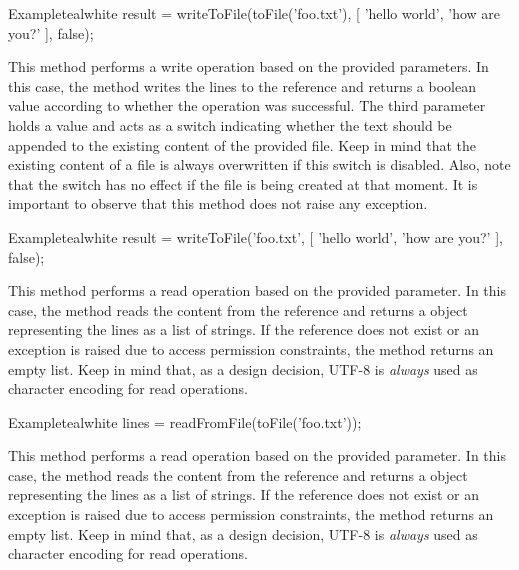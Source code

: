 \begin{description}
\begin{codebox}{Example}{teal}{\icnote}{white}
result = writeToFile(toFile('foo.txt'),
         [ 'hello world', 'how are you?' ], false);
\end{codebox}

\item[\mdbox{R}{\parbox{0.51\textwidth}{writeToFile(String reference,\\\hspace*{1em} List<String> lines, boolean append)}}{boolean}] This method performs a write operation based on the provided parameters. In this case, the method writes the  lines to the  reference and returns a boolean value according to whether the operation was successful. The third parameter holds a  value and acts as a switch indicating whether the text should be appended to the existing content of the provided file. Keep in mind that the existing content of a file is always overwritten if this switch is disabled. Also, note that the switch has no effect if the file is being created at that moment. It is important to observe that this method does not raise any exception.

\begin{codebox}{Example}{teal}{\icnote}{white}
result = writeToFile('foo.txt', [ 'hello world',
         'how are you?' ], false);
\end{codebox}

\item[\mdbox{R}{readFromFile(File file)}{List<String>}] This method performs a read operation based on the provided parameter. In this case, the method reads the content from the  reference and returns a  object representing the lines as a list of strings. If the reference does not exist or an exception is raised due to access permission constraints, the  method returns an empty list. Keep in mind that, as a design decision, UTF-8 is \emph{always} used as character encoding for read operations.

\begin{codebox}{Example}{teal}{\icnote}{white}
lines = readFromFile(toFile('foo.txt'));
\end{codebox}

\item[\mdbox{R}{readFromFile(String reference)}{List<String>}] This method performs a read operation based on the provided parameter. In this case, the method reads the content from the  reference and returns a  object representing the lines as a list of strings. If the reference does not exist or an exception is raised due to access permission constraints, the  method returns an empty list. Keep in mind that, as a design decision, UTF-8 is \emph{always} used as character encoding for read operations.


\end{description}

